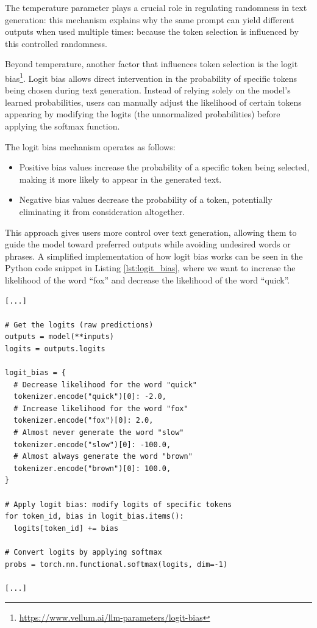 The temperature parameter plays a crucial role in regulating randomness in text
generation: this mechanism explains why the same prompt can yield different outputs
when used multiple times: because the token selection is influenced by this
controlled randomness.

Beyond temperature, another factor that influences token selection is the logit bias\footnote{\url{https://www.vellum.ai/llm-parameters/logit-bias}}.
Logit bias allows direct intervention in the probability of specific tokens being
chosen during text generation. Instead of relying solely on the model's learned
probabilities, users can manually adjust the likelihood of certain tokens appearing
by modifying the logits (the unnormalized probabilities) before applying the softmax
function.

The logit bias mechanism operates as follows:

\begin{itemize}
  \item Positive bias values increase the probability of a specific token being selected,
    making it more likely to appear in the generated text.

  \item Negative bias values decrease the probability of a token, potentially
    eliminating it from consideration altogether.
\end{itemize}

This approach gives users more control over text generation, allowing them to guide
the model toward preferred outputs while avoiding undesired words or phrases. A
simplified implementation of how logit bias works can be seen in the Python code
snippet in Listing \ref{lst:logit_bias}, where we want to increase the likelihood
of the word ``fox'' and decrease the likelihood of the word ``quick''.

\vspace{10mm}
\begin{codewindow}
    \begin{lstlisting}
[...]

# Get the logits (raw predictions)
outputs = model(**inputs)
logits = outputs.logits

logit_bias = {
  # Decrease likelihood for the word "quick"
  tokenizer.encode("quick")[0]: -2.0,
  # Increase likelihood for the word "fox"
  tokenizer.encode("fox")[0]: 2.0,
  # Almost never generate the word "slow"
  tokenizer.encode("slow")[0]: -100.0,
  # Almost always generate the word "brown"
  tokenizer.encode("brown")[0]: 100.0,
}

# Apply logit bias: modify logits of specific tokens
for token_id, bias in logit_bias.items():
  logits[token_id] += bias

# Convert logits by applying softmax
probs = torch.nn.functional.softmax(logits, dim=-1)

[...]
\end{lstlisting}
\end{codewindow}
\vspace{10mm}

